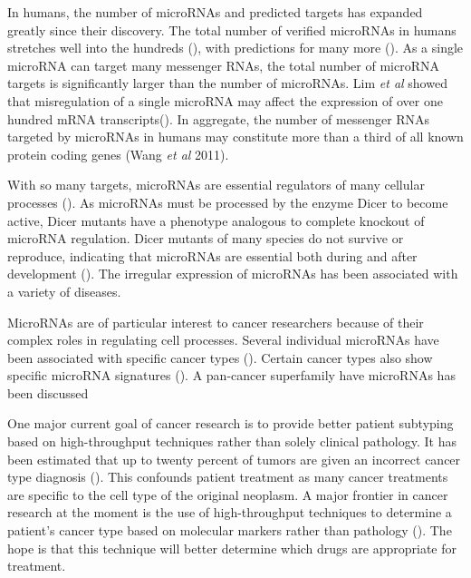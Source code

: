 \documentclass[12pt]{report}
\begin{document}
In humans, the number of microRNAs and predicted targets has expanded greatly since their discovery.
 The total number of verified microRNAs in humans  stretches well into the 
 hundreds (), with predictions for many more (). As a single microRNA can target 
 many messenger RNAs, the total number of microRNA targets is significantly 
 larger than the number of microRNAs.   Lim \emph{et al} showed that misregulation of 
a single microRNA may affect the expression of over one hundred mRNA 
transcripts(). In aggregate, the number of messenger RNAs targeted by 
 microRNAs in humans may constitute more than a third of all known protein coding genes
 (Wang \emph{et al} 2011).
 
 
With so many targets, microRNAs are essential regulators of many cellular processes ().  
As microRNAs must be processed by the enzyme Dicer to become active, Dicer 
mutants have a phenotype analogous to complete knockout of microRNA regulation. 
Dicer mutants of many species do not survive or reproduce, indicating that microRNAs are essential both
during and after development (). The irregular expression of microRNAs has been 
associated with a variety of diseases. 


MicroRNAs are of particular interest to cancer researchers because of their 
complex roles in regulating cell processes. Several individual microRNAs have been 
associated with specific cancer types (). %
Certain cancer types also show specific microRNA signatures (). %
A pan-cancer superfamily have microRNAs has been discussed %


One major current goal of cancer research is to provide better patient subtyping based on 
high-throughput techniques rather than solely clinical pathology. It has been 
estimated that up to twenty percent of tumors are given an incorrect cancer type 
diagnosis (). This confounds patient treatment as many cancer treatments are 
specific to the cell type of the original neoplasm. A major frontier in cancer 
research at the moment is the use of high-throughput techniques to determine a 
patient's cancer type based on molecular markers rather than pathology (). The 
hope is that this technique will better determine which drugs are appropriate 
for treatment.
\end{document}
